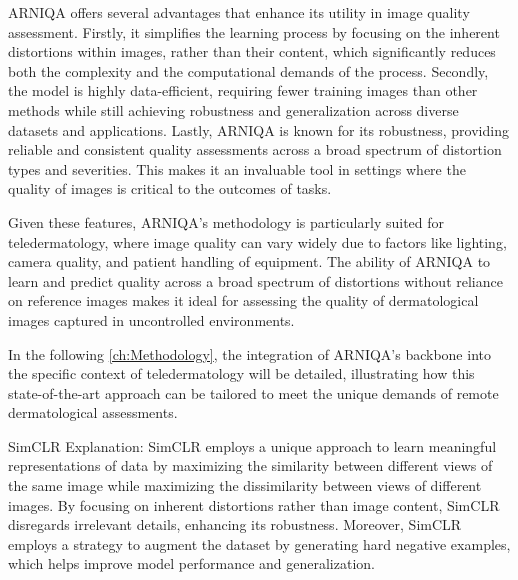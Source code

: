 \vspace{\baselineskip}
\noindent
ARNIQA offers several advantages that enhance its utility in image quality assessment. Firstly, it simplifies the learning process by focusing on the inherent distortions within images, rather than their content, which significantly reduces both the complexity and the computational demands of the process. Secondly, the model is highly data-efficient, requiring fewer training images than other methods while still achieving robustness and generalization across diverse datasets and applications. Lastly, ARNIQA is known for its robustness, providing reliable and consistent quality assessments across a broad spectrum of distortion types and severities. This makes it an invaluable tool in settings where the quality of images is critical to the outcomes of tasks. \par
\vspace{\baselineskip}
\noindent
Given these features, ARNIQA's methodology is particularly suited for teledermatology, where image quality can vary widely due to factors like lighting, camera quality, and patient handling of equipment. The ability of ARNIQA to learn and predict quality across a broad spectrum of distortions without reliance on reference images makes it ideal for assessing the quality of dermatological images captured in uncontrolled environments. \par
\vspace{\baselineskip}
\noindent
In the following \autoref{ch:Methodology}, the integration of ARNIQA's backbone into the specific context of teledermatology will be detailed, illustrating how this state-of-the-art approach can be tailored to meet the unique demands of remote dermatological assessments. \par
\vspace{\baselineskip}
\noindent
SimCLR Explanation: SimCLR employs a unique approach to learn meaningful representations of data by maximizing the similarity between different views of the same image while maximizing the dissimilarity between views of different images. By focusing on inherent distortions rather than image content, SimCLR disregards irrelevant details, enhancing its robustness. Moreover, SimCLR employs a strategy to augment the dataset by generating hard negative examples, which helps improve model performance and generalization. \par

